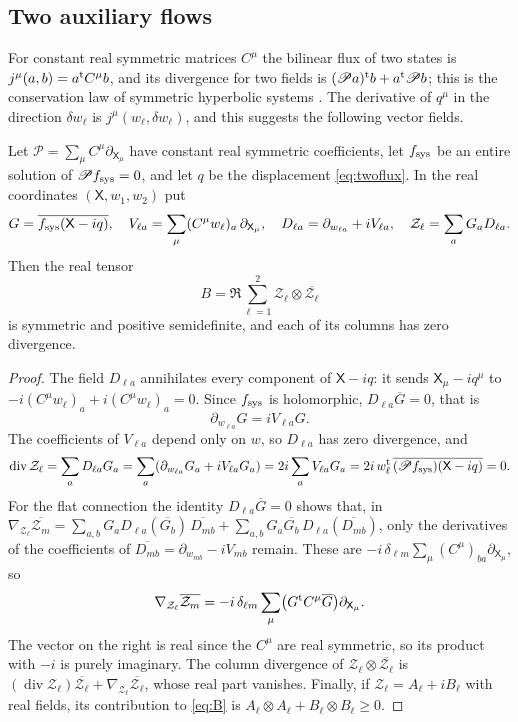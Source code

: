 \subsection{Two auxiliary flows}
For constant real symmetric matrices $C^\mu$ the bilinear flux of two states is
$j^\mu(a,b)=a^{\rm t}C^\mu b$, and its divergence for two fields is
$(\mathscr Pa)^{\rm t}b+a^{\rm t}\mathscr Pb$; this is the conservation law of symmetric
hyperbolic systems \cite{Fri54}. The derivative of $q^\mu$ in the direction $\delta w_\ell$ is
$j^\mu(w_\ell,\delta w_\ell)$, and this suggests the following vector fields.

\begin{lemma}\label{lem:flows}
Let $\mathscr P=\sum_\mu C^\mu\partial_{\mathsf X_\mu}$ have constant real symmetric
coefficients, let $f_{\rm sys}$ be an entire solution of $\mathscr Pf_{\rm sys}=0$, and let $q$ be
the displacement \eqref{eq:twoflux}. In the real coordinates $(\mathsf X,w_1,w_2)$ put
\[
G=\overline{f_{\rm sys}(\mathsf X-iq)},\quad V_{\ell a}=\sum_\mu(C^\mu w_\ell)_a\,\partial_{\mathsf X_\mu},\quad
D_{\ell a}=\partial_{w_{\ell a}}+iV_{\ell a},\quad \mathcal Z_\ell=\sum_aG_aD_{\ell a}.
\]
Then the real tensor
\begin{equation}\label{eq:B}
B=\Re\sum_{\ell=1}^2\mathcal Z_\ell\otimes\overline{\mathcal Z_\ell}
\end{equation}
is symmetric and positive semidefinite, and each of its columns has zero divergence.
\end{lemma}

\begin{proof}
The field $D_{\ell a}$ annihilates every component of $\mathsf X-iq$: it sends
$\mathsf X_\mu-iq^\mu$ to $-i(C^\mu w_\ell)_a+i(C^\mu w_\ell)_a=0$. Since $f_{\rm sys}$ is
holomorphic, $D_{\ell a}\overline G=0$, that is
\[
\partial_{w_{\ell a}}G=iV_{\ell a}G .
\]
The coefficients of $V_{\ell a}$ depend only on $w$, so $D_{\ell a}$ has zero divergence, and
\[
\operatorname{div}\mathcal Z_\ell=\sum_aD_{\ell a}G_a=\sum_a(\partial_{w_{\ell a}}G_a+iV_{\ell a}G_a)
=2i\sum_aV_{\ell a}G_a=2i\,w_\ell^{\rm t}\,\overline{(\mathscr Pf_{\rm sys})(\mathsf X-iq)}=0 .
\]
For the flat connection the identity $D_{\ell a}\overline G=0$ shows that, in
$\nabla_{\mathcal Z_\ell}\overline{\mathcal Z_m}=\sum_{a,b}G_a D_{\ell a}(\overline{G_b})\,\overline{D_{mb}}
+\sum_{a,b}G_a\overline{G_b}\,D_{\ell a}(\overline{D_{mb}})$, only the derivatives of the
coefficients of $\overline{D_{mb}}=\partial_{w_{mb}}-iV_{mb}$ remain. These are
$-i\,\delta_{\ell m}\sum_\mu (C^\mu)_{ba}\partial_{\mathsf X_\mu}$, so
\[
\nabla_{\mathcal Z_\ell}\overline{\mathcal Z_m}=-i\,\delta_{\ell m}\sum_\mu\bigl(G^{\rm t}C^\mu\overline G\bigr)\partial_{\mathsf X_\mu}.
\]
The vector on the right is real since the $C^\mu$ are real symmetric, so its product with $-i$ is
purely imaginary. The column divergence of $\mathcal Z_\ell\otimes\overline{\mathcal Z_\ell}$ is
$(\operatorname{div}\mathcal Z_\ell)\overline{\mathcal Z_\ell}+\nabla_{\mathcal Z_\ell}\overline{\mathcal Z_\ell}$,
whose real part vanishes. Finally, if $\mathcal Z_\ell=A_\ell+iB_\ell$ with real fields, its
contribution to \eqref{eq:B} is $A_\ell\otimes A_\ell+B_\ell\otimes B_\ell\ge0$.
\end{proof}

